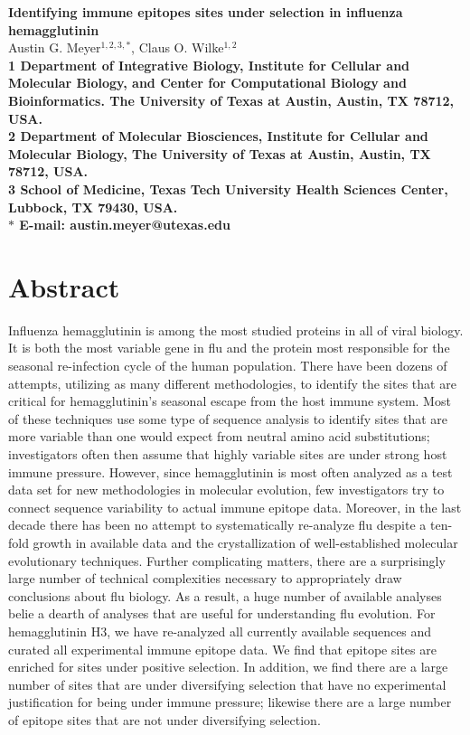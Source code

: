 \documentclass[10pt]{article}
\date{}
\begin{document}
\begin{flushleft}
{\Large
\textbf{Identifying immune epitopes sites under selection in influenza hemagglutinin}
}
\\
Austin G. Meyer$^{1,2,3, \ast}$, 
Claus O. Wilke$^{1,2}$
\\
\bf{1} Department of Integrative Biology, Institute for Cellular and Molecular Biology, and Center for Computational Biology and Bioinformatics. The University of Texas at Austin, Austin, TX 78712, USA.
\\
\bf{2} Department of Molecular Biosciences, Institute for Cellular and Molecular Biology, The University of Texas at Austin, Austin, TX 78712, USA.
\\
\bf{3} School of Medicine, Texas Tech University Health Sciences Center, Lubbock, TX 79430, USA.
\\
$\ast$ E-mail: austin.meyer@utexas.edu
\end{flushleft}

\section*{Abstract}
Influenza hemagglutinin is among the most studied proteins in all of viral biology. It is both the most variable gene in flu and the protein most responsible for the seasonal re-infection cycle of the human population. There have been dozens of attempts, utilizing as many different methodologies, to identify the sites that are critical for hemagglutinin's seasonal escape from the host immune system. Most of these techniques use some type of sequence analysis to identify sites that are more variable than one would expect from neutral amino acid substitutions; investigators often then assume that highly variable sites are under strong host immune pressure. However, since hemagglutinin is most often analyzed as a test data set for new methodologies in molecular evolution, few investigators try to connect sequence variability to actual immune epitope data. Moreover, in the last decade there has been no attempt to systematically re-analyze flu despite a ten-fold growth in available data and the crystallization of well-established molecular evolutionary techniques. Further complicating matters, there are a surprisingly large number of technical complexities necessary to appropriately draw conclusions about flu biology. As a result, a huge number of available analyses belie a dearth of analyses that are useful for understanding flu evolution. For hemagglutinin H3, we have re-analyzed all currently available sequences and curated all experimental immune epitope data. We find that epitope sites are enriched for sites under positive selection. In addition, we find there are a large number of sites that are under diversifying selection that have no experimental justification for being under immune pressure; likewise there are a large number of epitope sites that are not under diversifying selection. 
\end{document}
